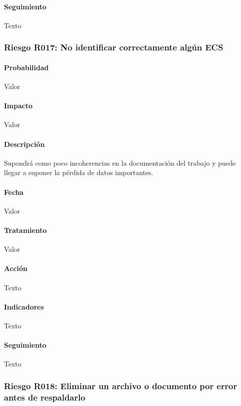 \documentclass[10pt,a4paper]{article}
\begin{document}
				\paragraph{Seguimiento}	Texto %
				\subsubsection{Riesgo R017: No identificar correctamente algún ECS }
				\paragraph{Probabilidad} Valor
				\paragraph{Impacto}	Valor
				\paragraph{Descripción} Supondrá como poco incoherencias en la documentación del trabajo y puede llegar a suponer la pérdida de datos importantes.
				\paragraph{Fecha} Valor %
				\paragraph{Tratamiento} Valor %
				\paragraph{Acción} Texto %
				\paragraph{Indicadores} Texto %
				\paragraph{Seguimiento}	Texto %
				\subsubsection{Riesgo R018: Eliminar un archivo o documento por error antes de respaldarlo}
\end{document}
